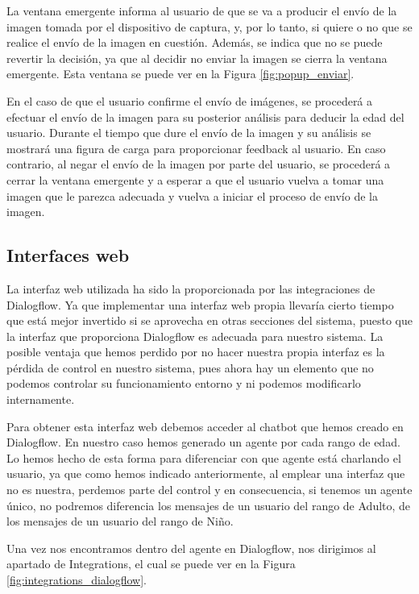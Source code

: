 \begin{itemize}
La ventana emergente informa al usuario de que se va a producir el envío de la imagen tomada por el dispositivo de captura, y, por lo tanto, si quiere o no que se realice el envío de la imagen en cuestión. Además, se indica que no se puede revertir la decisión, ya que al decidir no enviar la imagen se cierra la ventana emergente. Esta ventana se puede ver en la Figura \ref{fig:popup_enviar}.

En el caso de que el usuario confirme el envío de imágenes, se procederá a efectuar el envío de la imagen para su posterior análisis para deducir la edad del usuario. Durante el tiempo que dure el envío de la imagen y su análisis se mostrará una figura de carga para proporcionar feedback al usuario. En caso contrario, al negar el envío de la imagen por parte del usuario, se procederá a cerrar la ventana emergente y a esperar a que el usuario vuelva a tomar una imagen que le parezca adecuada y vuelva a iniciar el proceso de envío de la imagen.

\end{itemize}

\subsection{Interfaces web}

La interfaz web utilizada ha sido la proporcionada por las integraciones de Dialogflow. Ya que implementar una interfaz web propia llevaría cierto tiempo que está mejor invertido si se aprovecha en otras secciones del sistema, puesto que la interfaz que proporciona Dialogflow es adecuada para nuestro sistema. La posible ventaja que hemos perdido por no hacer nuestra propia interfaz es la pérdida de control en nuestro sistema, pues ahora hay un elemento que no podemos controlar su funcionamiento entorno y ni podemos modificarlo internamente.

Para obtener esta interfaz web debemos acceder al chatbot que hemos creado en Dialogflow. En nuestro caso hemos generado un agente por cada rango de edad. Lo hemos hecho de esta forma para diferenciar con que agente está charlando el usuario, ya que como hemos indicado anteriormente, al emplear una interfaz que no es nuestra, perdemos parte del control y en consecuencia, si tenemos un agente único, no podremos diferencia los mensajes de un usuario del rango de Adulto, de los mensajes de un usuario del rango de Niño.

Una vez nos encontramos dentro del agente en Dialogflow, nos dirigimos al apartado de Integrations, el cual se puede ver en la Figura \ref{fig:integrations_dialogflow}.

